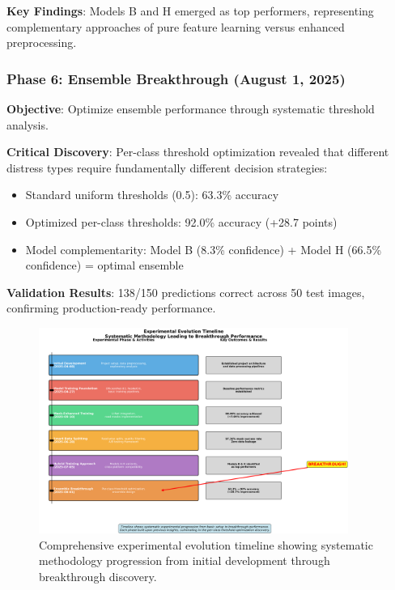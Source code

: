 \documentclass[12pt]{article}
\begin{document}
\textbf{Key Findings}: Models B and H emerged as top performers, representing complementary approaches of pure feature learning versus enhanced preprocessing.

\subsubsection{Phase 6: Ensemble Breakthrough (August 1, 2025)}

\textbf{Objective}: Optimize ensemble performance through systematic threshold analysis.

\textbf{Critical Discovery}: Per-class threshold optimization revealed that different distress types require fundamentally different decision strategies:

\begin{itemize}[itemsep=1pt,parsep=0pt,topsep=2pt]
\item Standard uniform thresholds (0.5): 63.3\% accuracy
\item Optimized per-class thresholds: 92.0\% accuracy (+28.7 points)
\item Model complementarity: Model B (8.3\% confidence) + Model H (66.5\% confidence) = optimal ensemble
\end{itemize}

\textbf{Validation Results}: 138/150 predictions correct across 50 test images, confirming production-ready performance.

\begin{figure}[!htb]
\centering
\includegraphics[width=0.9\textwidth]{images/experimental_timeline_detailed.png}
\caption{Comprehensive experimental evolution timeline showing systematic methodology progression from initial development through breakthrough discovery.}
\end{figure}
\end{document}

